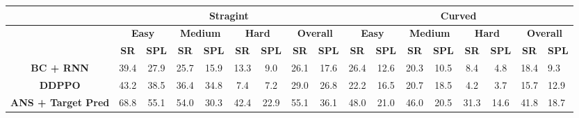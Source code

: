 \begin{tabular}{@{}ccccccccc|ccccccll@{}}
\toprule
\multicolumn{1}{l}{}             & \multicolumn{8}{c|}{\textbf{Stragint}}                                                                                                                                        & \multicolumn{8}{c}{\textbf{Curved}}                                                                                                                                                 \\ \midrule
\multicolumn{1}{l}{}             & \multicolumn{2}{c}{\textbf{Easy}}                   & \multicolumn{2}{c}{\textbf{Medium}}      & \multicolumn{2}{c}{\textbf{Hard}} & \multicolumn{2}{c|}{\textbf{Overall}}    & \multicolumn{2}{c}{\textbf{Easy}} & \multicolumn{2}{c}{\textbf{Medium}} & \multicolumn{2}{c}{\textbf{Hard}} & \multicolumn{2}{c}{\textbf{Overall}}                                  \\
\multicolumn{1}{l}{}             & \textbf{SR}              & \textbf{SPL}             & \textbf{SR}   & \textbf{SPL}             & \textbf{SR}     & \textbf{SPL}    & \textbf{SR}              & \textbf{SPL}  & \textbf{SR}     & \textbf{SPL}    & \textbf{SR}      & \textbf{SPL}     & \textbf{SR}     & \textbf{SPL}    & \multicolumn{1}{c}{\textbf{SR}}   & \multicolumn{1}{c}{\textbf{SPL}}  \\ \midrule
\textbf{BC + RNN}                & 39.4                     & 27.9                     & 25.7          & 15.9                     & 13.3            & 9.0             & \multicolumn{1}{l}{26.1} & 17.6          & 26.4            & 12.6            & 20.3             & 10.5             & 8.4             & 4.8             & 18.4                              & 9.3                               \\
\textbf{DDPPO \cite{DDPPO}}                   & 43.2                     & 38.5                     & 36.4          & 34.8                     & 7.4             & 7.2             & \multicolumn{1}{l}{29.0} & 26.8          & 22.2            & 16.5            & 20.7             & 18.5             & 4.2             & 3.7             & 15.7                              & 12.9                              \\
\textbf{ANS + Target Pred \cite{occ_ans}}       & 68.8                     & 55.1                     & 54.0          & 30.3                     & 42.4            & 22.9            & \multicolumn{1}{l}{55.1} & 36.1          & 48.0            & 21.0            & 46.0             & 20.5             & 31.3            & 14.6            & 41.8                              & 18.7                              \\

\end{tabular}
